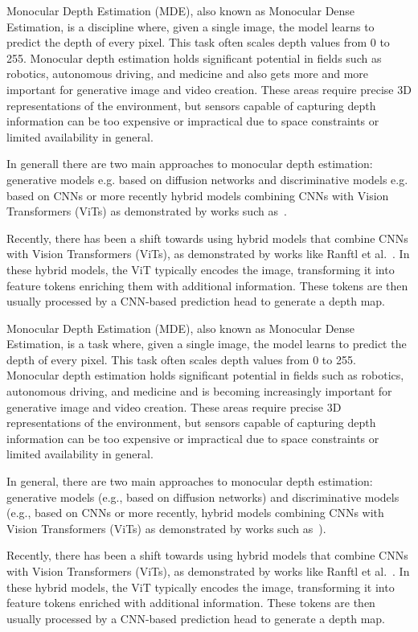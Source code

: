 Monocular Depth Estimation (MDE), also known as Monocular Dense Estimation, is a discipline where, given a single image, the model learns to predict the depth of every pixel.
This task often scales depth values from 0 to 255. 
Monocular depth estimation holds significant potential in fields such as robotics, autonomous driving, and medicine and also gets more and more important for generative image and video creation. 
These areas require precise 3D representations of the environment, but sensors capable of capturing depth information can be too expensive or impractical due to space constraints or limited availability in general.

In generall there are two main approaches to monocular depth estimation: generative models e.g. based on diffusion networks and discriminative models e.g. based on CNNs or more recently hybrid models combining CNNs with Vision Transformers (ViTs) as demonstrated by works such as~\cite{Ranftl2021,Yang2024,Oquab2023}.

Recently, there has been a shift towards using hybrid models that combine CNNs with Vision Transformers (ViTs), as demonstrated by works like Ranftl et al.~\cite{Ranftl2021}. 
In these hybrid models, the ViT typically encodes the image, transforming it into feature tokens enriching them with additional information. 
These tokens are then usually processed by a CNN-based prediction head to generate a depth map.

Monocular Depth Estimation (MDE), also known as Monocular Dense Estimation, is a task where, given a single image, the model learns to predict the depth of every pixel. 
This task often scales depth values from 0 to 255. 
Monocular depth estimation holds significant potential in fields such as robotics, autonomous driving, and medicine and is becoming increasingly important for generative image and video creation. 
These areas require precise 3D representations of the environment, but sensors capable of capturing depth information can be too expensive or impractical due to space constraints or limited availability in general.

In general, there are two main approaches to monocular depth estimation: generative models (e.g., based on diffusion networks) and discriminative models (e.g., based on CNNs or more recently, hybrid models combining CNNs with Vision Transformers (ViTs) as demonstrated by works such as~\cite{Ranftl2021,Yang2024,Oquab2023}).

Recently, there has been a shift towards using hybrid models that combine CNNs with Vision Transformers (ViTs), as demonstrated by works like Ranftl et al.~\cite{Ranftl2021}. 
In these hybrid models, the ViT typically encodes the image, transforming it into feature tokens enriched with additional information. 
These tokens are then usually processed by a CNN-based prediction head to generate a depth map.

